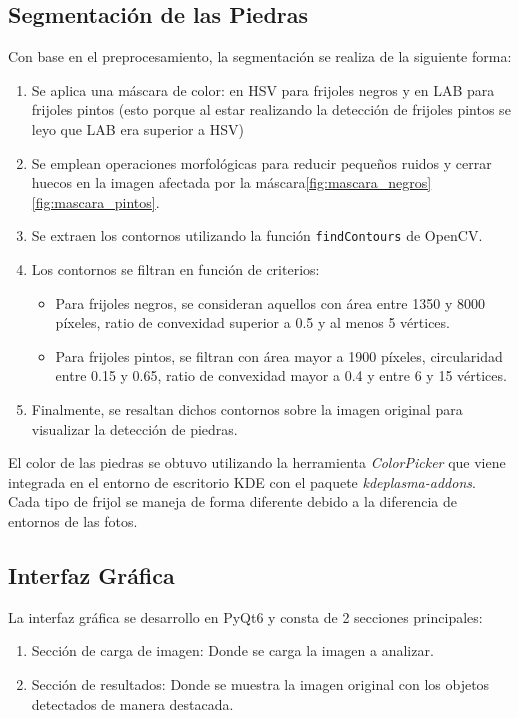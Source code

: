 \documentclass[conference]{IEEEtran}
\begin{document}
    \subsection{Segmentación de las Piedras}
    Con base en el preprocesamiento, la segmentación se realiza de la siguiente forma:
    \begin{enumerate}
        \item Se aplica una máscara de color: en HSV para frijoles negros y en LAB para frijoles pintos (esto porque al estar realizando la detección de frijoles pintos se leyo\cite{lab} que LAB era superior a HSV)
        \item Se emplean operaciones morfológicas para reducir pequeños ruidos y cerrar huecos en la imagen afectada por la máscara\ref{fig:mascara_negros}\ref{fig:mascara_pintos}.
        \item Se extraen los contornos utilizando la función \texttt{findContours} de OpenCV.
        \item Los contornos se filtran en función de criterios:
        \begin{itemize}
            \item Para frijoles negros, se consideran aquellos con área entre 1350 y 8000 píxeles, ratio de convexidad superior a 0.5 y al menos 5 vértices.
            \item Para frijoles pintos, se filtran con área mayor a 1900 píxeles, circularidad entre 0.15 y 0.65, ratio de convexidad mayor a 0.4 y entre 6 y 15 vértices.
        \end{itemize}
        \item Finalmente, se resaltan dichos contornos sobre la imagen original para visualizar la detección de piedras.
    \end{enumerate}

    El color de las piedras se obtuvo utilizando la herramienta \textit{ColorPicker}\cite{colorpicker} que viene integrada en el entorno de escritorio KDE con el paquete \textit{kdeplasma-addons}. Cada tipo de frijol se maneja de forma diferente debido a la diferencia de entornos de las fotos.

    \subsection{Interfaz Gráfica}
    La interfaz gráfica se desarrollo en PyQt6\cite{pyqt6} y consta de 2 secciones principales:
    \begin{enumerate}
        \item Sección de carga de imagen: Donde se carga la imagen a analizar.
        \item Sección de resultados: Donde se muestra la imagen original con los objetos detectados de manera destacada.
    \end{enumerate}
\end{document}
